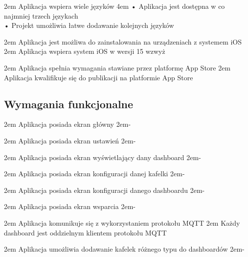 {2em}{
    Aplikacja wspiera wiele języków
}
{4em}{
    • Aplikacja jest dostępna w co najmniej trzech językach\\
    • Projekt umożliwia łatwe dodawanie kolejnych języków
}

{2em}{
    Aplikacja jest możliwa do zainstalowania na urządzeniach z systemem iOS
}
{2em}{
    Aplikacja wspiera system iOS w wersji 15 wzwyż
}

{2em}{
    Aplikacja spełnia wymagania stawiane przez platformę App Store
}
{2em}{
    Aplikacja kwalifikuje się do publikacji na platformie App Store
}

\newpage

\subsection{Wymagania funkcjonalne}{}

{2em}{
    Aplikacja posiada ekran główny
}
{2em}{-}

{2em}{
    Aplikacja posiada ekran ustawień
}
{2em}{-}

{2em}{
    Aplikacja posiada ekran wyświetlający dany dashboard
}
{2em}{-}

{2em}{
    Aplikacja posiada ekran konfiguracji danej kafelki
}
{2em}{-}

{2em}{
    Aplikacja posiada ekran konfiguracji danego dashboardu
}
{2em}{-}

{2em}{
    Aplikacja posiada ekran wsparcia
}
{2em}{-}

{2em}{
    Aplikacja komunikuje się z wykorzystaniem protokołu MQTT
}
{2em}{
    Każdy dashboard jest oddzielnym klientem protokołu MQTT
}

{2em}{
    Aplikacja umożliwia dodawanie kafelek różnego typu do dashboardów
}
{2em}{-}


